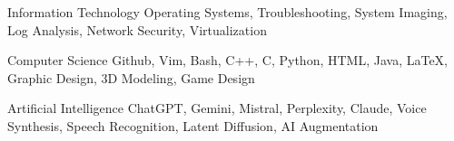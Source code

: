 
\begin{cvskills}

  \cvskill
    {Information Technology} %
    {Operating Systems, Troubleshooting, System Imaging, Log Analysis, Network Security, Virtualization} %

  \cvskill
    {Computer Science} %
    {Github, Vim, Bash, C++, C, Python, HTML, Java, LaTeX, Graphic Design, 3D Modeling, Game Design} %

  \cvskill
    {Artificial Intelligence} %
	{ChatGPT, Gemini, Mistral, Perplexity, Claude, Voice Synthesis, Speech Recognition, Latent Diffusion, AI Augmentation} %

\end{cvskills}
